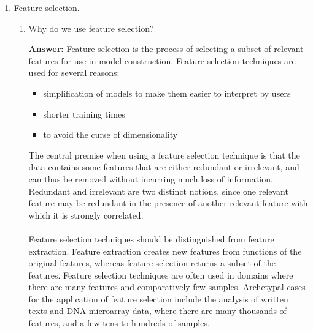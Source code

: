 \documentclass{article}
\newenvironment{QandA}{\begin{enumerate}[label=\arabic*.]}{\end{enumerate}}
\newenvironment{InnerQandA}{\begin{enumerate}[label=\roman*.]}{\end{enumerate}}
\newenvironment{answer}{\par\normalfont \textbf{Answer:}}{}
\begin{document}
\begin{QandA}
    \item Feature selection.
    \begin{InnerQandA}
        \item Why do we use feature selection?
        \begin{answer}
            Feature selection is the process of selecting a subset of relevant features for use in model construction. Feature selection techniques are used for several reasons:
            \begin{itemize}
                \item simplification of models to make them easier to interpret by users
                \item shorter training times
                \item to avoid the curse of dimensionality
            \end{itemize}
        The central premise when using a feature selection technique is that the data contains some features that are either redundant or irrelevant, and can thus be removed without incurring much loss of information. Redundant and irrelevant are two distinct notions, since one relevant feature may be redundant in the presence of another relevant feature with which it is strongly correlated.\\\\
        Feature selection techniques should be distinguished from feature extraction. Feature extraction creates new features from functions of the original features, whereas feature selection returns a subset of the features. Feature selection techniques are often used in domains where there are many features and comparatively few samples. Archetypal cases for the application of feature selection include the analysis of written texts and DNA microarray data, where there are many thousands of features, and a few tens to hundreds of samples.
        \end{answer}


\end{InnerQandA}
\end{QandA}
\end{document}

